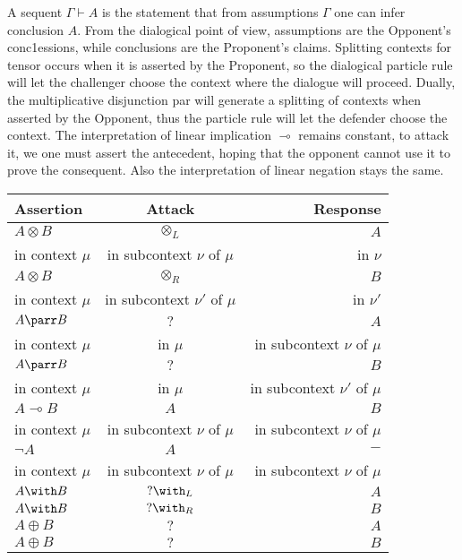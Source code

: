 \documentclass{article}
\begin{document}
A sequent $\Gamma \vdash A$ is the statement that from assumptions $\Gamma$  one can infer conclusion $A$. From the dialogical point of view, assumptions are the Opponent's conc1essions, while conclusions are the Proponent's claims. Splitting contexts for tensor occurs when it is asserted by the Proponent, so the dialogical particle rule will let the challenger choose the context where the dialogue will proceed. Dually, the multiplicative disjunction par will generate a splitting of contexts when asserted by the Opponent, thus the particle rule will let the defender choose the context. The interpretation of linear implication $\multimap$ remains constant, to attack it, we one must assert the antecedent, hoping that the opponent cannot use it to prove the consequent. Also the interpretation of linear negation stays the same.

\begin{center}
  \begin{tabular}{| l | c || r |}
    \hline
  Assertion & Attack  & Response \\ \hline
  $ A\otimes B$& $\otimes_{L}$& $A$   \\ 
   in context $\mu$ & in subcontext $\nu$ of $\mu$ &in $\nu$ \\  \hline
   $A\otimes B$  & $\otimes_{R}$ & $B$ \\ 
      in context $\mu$ & in subcontext $\nu'$ of $\mu$ &in $\nu'$ \\  \hline
    $ A\parr B$ & $?$ & $A$  \\ 
       in context $\mu$ &in $\mu$  &in subcontext $\nu$ of $\mu$ \\  \hline
     $ A\parr B$ & $?$ & $B$ \\ 
           in context $\mu$ &in $\mu$  &in subcontext $\nu'$ of $\mu$ \\\hline
    $ A\multimap B$ & $A$ & $B$ \\ 
          in context $\mu$ & in subcontext $\nu$ of $\mu$ & in subcontext $\nu$ of $\mu$\\ \hline
     $ \neg A$ & $A$ & $-$ \\ 
       in context $\mu$ & in subcontext $\nu$ of $\mu$ & in subcontext $\nu$ of $\mu$\\ \hline
    $ A\with B$& $?\with_{L}$& $A$   \\   
      $ A\with B$& $?\with_{R}$& $B$   \\ \hline
        $ A\oplus B$& $?$& $A$   \\   
          $ A\oplus B$& $?$& $B$   \\    
    \hline
  \end{tabular}
\end{center}
\end{document}
